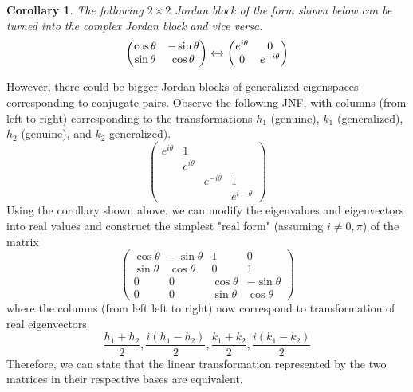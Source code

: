 \documentclass{article}
\newtheorem{corollary}{Corollary}[theorem]
\theoremstyle{remark}
\theoremstyle{definition}
\begin{document}
    \begin{corollary}
    The following $2 \times 2$ Jordan block of the form shown below can be turned into the complex Jordan block and vice versa. 
    \[\begin{pmatrix}
    \cos{\theta} & -\sin{\theta} \\
    \sin{\theta} & \cos{\theta} 
    \end{pmatrix} \xleftrightarrow{} \begin{pmatrix}
    e^{i \theta} & 0 \\
    0 & e^{- i \theta}
    \end{pmatrix}\]
    \end{corollary}

    However, there could be bigger Jordan blocks of generalized eigenspaces corresponding to conjugate pairs. Observe the following JNF, with columns (from left to right) corresponding to the transformations $h_1$ (genuine), $k_1$ (generalized), $h_2$ (genuine), and $k_2$ generalized). 
    \[\begin{pmatrix}
    e^{i \theta} & 1 & & \\
    & e^{i \theta} & & \\
    & & e^{-i \theta} & 1 \\
    & & & e^{i- \theta}
    \end{pmatrix}\]
    Using the corollary shown above, we can modify the eigenvalues and eigenvectors into real values and construct the simplest "real form" (assuming $i \neq 0, \pi$) of the matrix 
    \[\begin{pmatrix}
    \cos{\theta} & - \sin{\theta} & 1 & 0 \\
    \sin{\theta} & \cos{\theta} & 0 & 1 \\
    0 & 0 & \cos{\theta} & - \sin{\theta} \\
    0 & 0 & \sin{\theta} & \cos{\theta}
    \end{pmatrix}\]
    where the columns (from left left to right) now correspond to transformation of real eigenvectors
    \[\frac{h_1 + h_2}{2}, \frac{i(h_1 - h_2)}{2}, \frac{k_1 + k_2}{2}, \frac{i(k_1 - k_2)}{2}\]
    Therefore, we can state that the linear transformation represented by the two matrices in their respective bases are equivalent. 
\end{document}
